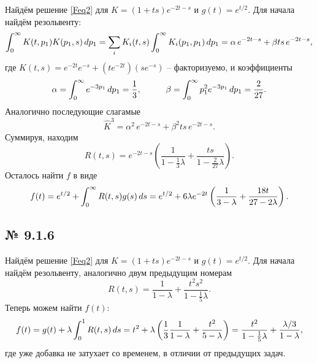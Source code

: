 Найдём решение \eqref{Feq2} для $K = (1 + ts)e^{-2t -s}$ и $g(t) = e^{t/2}$. Для начала найдём резольвенту:
\begin{equation*}
	\int_{0}^{\infty} K(t, p_1) K(p_1, s) \, d p_1 = 
	\sum_i K_i(t,s) \int_{0}^{\infty} K_i (p_1, p_1) \, d p_1 = 
	\alpha\, e^{-2t -s} + \beta ts\, e^{-2t-s},
\end{equation*}
где $K(t,s) = e^{-2 t}e^{-s} + (t e^{-2t}) (s e^{-s})$ -- факторизуемо, и коэффициенты 
\begin{equation*}
	\alpha = \int_{0}^{\infty} e^{-3 p_1} \d p_1 = \frac{1}{3},
	\hspace{10 mm} 
	\beta = \int_{0}^{\infty} p_1^2 e^{-3 p_1} \d p_1 = \frac{2}{27}.
\end{equation*}
Аналогично последующие слагамые
\begin{equation*}
	\hat{K}^3 = \alpha^2\, e^{-2t-s} + \beta^2 ts\, e^{-2t-s}.
\end{equation*}
Суммируя, находим
\begin{equation*}
	R(t, s) = e^{-2t-s}\left(\frac{1}{1-\frac{1}{3}\lambda} + \frac{ts}{1 - \frac{2}{27}\lambda}\right).
\end{equation*}
Осталось найти $f$ в виде
\begin{equation*}
	f(t) = e^{t/2} + \int_{0}^{\infty} R(t,s) g(s) \, d s = e^{t/2} + 6 \lambda e^{-2 t} \left(\frac{1}{3-\lambda }+\frac{18 t}{27-2 \lambda }\right).
\end{equation*}





\subsection*{№ 9.1.6}

Найдём решение \eqref{Feq2} для $K = (1 + ts)e^{-2t -s}$ и $g(t) = e^{t/2}$. Для начала найдём резольвенту, аналогично двум предыдущим номерам
\begin{equation*}
	R(t, s) = \frac{1}{1-\lambda} + \frac{t^2 s^2}{1 - \frac{1}{5}\lambda}.
\end{equation*}
Теперь можем найти $f(t)$:
\begin{equation*}
	f(t) = g(t) + \lambda \int_{0}^{1} R(t,s) \, d s = t^2 + \lambda \left(
		\frac{1}{3}\frac{1}{1- \lambda }+\frac{t^2}{5-\lambda }
	\right) =  \frac{t^2}{1-\frac{1}{5}\lambda} + \frac{\lambda/3}{1-\lambda},
\end{equation*}
где уже добавка не затухает со временем, в отличии от предыдущих задач.